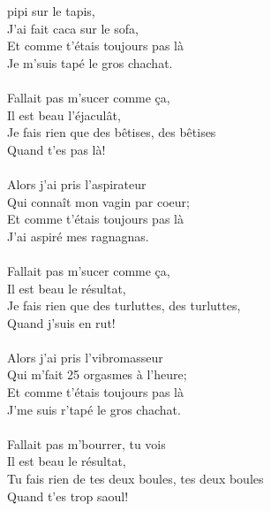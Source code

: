 
 pipi sur le tapis,
\\J'ai fait caca sur le sofa,
\\Et comme t'étais toujours pas là
\\Je m'suis tapé le gros chachat.
\\\\Fallait pas m'sucer comme ça,
\\Il est beau l'éjaculât,
\\Je fais rien que des bêtises, des bêtises
\\Quand t'es pas là!
\\\\Alors j'ai pris l'aspirateur
\\Qui connaît mon vagin par coeur;
\\Et comme t'étais toujours pas là
\\J'ai aspiré mes ragnagnas.
\\\\Fallait pas m'sucer comme ça,
\\Il est beau le résultat,
\\Je fais rien que des turluttes, des turluttes,
\\Quand j'suis en rut!
\\\\Alors j'ai pris l'vibromasseur
\\Qui m'fait 25 orgasmes à l'heure;
\\Et comme t'étais toujours pas là
\\J'me suis r'tapé le gros chachat.
\\\\Fallait pas m'bourrer, tu vois
\\Il est beau le résultat,
\\Tu fais rien de tes deux boules, tes deux boules
\\Quand t'es trop saoul!

\breakpage